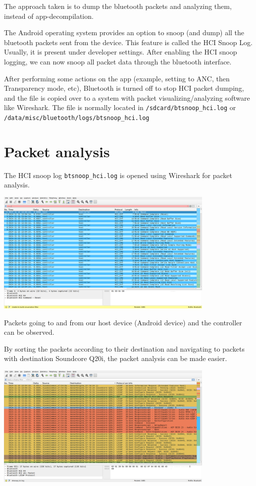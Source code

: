 \documentclass{article}
\theoremstyle{mytheoremstyle}
\theoremstyle{mytheoremstyle}
\theoremstyle{myproblemstyle}
\begin{document}
The approach taken is to dump the bluetooth packets and analyzing them, instead of app-decompilation.

The Android operating system provides an option to snoop (and dump) all the bluetooth packets sent from the device.
This feature is called the HCI Snoop Log. Usually, it is present under developer settings.
After enabling the HCI snoop logging, we can now snoop all packet data through the bluetooth interface.

After performing some actions on the app (example, setting to ANC, then Transparency mode, etc),
Bluetooth is turned off to stop HCI packet dumping,
and the file is copied over to a system with packet visualizing/analyzing software like Wireshark.
The file is normally located in \texttt{/sdcard/btsnoop\_hci.log} or \texttt{/data/misc/bluetooth/logs/btsnoop\_hci.log}


\section{Packet analysis}

The HCI snoop log \texttt{btsnoop\_hci.log} is opened using Wireshark for packet analysis.
\begin{center}
  \includegraphics[width=400px]{wireshark-launch}
\end{center}

Packets going to and from our host device (Android device) and the controller can be observed.

By sorting the packets according to their destination and navigating to packets with destination Soundcore Q20i,
the packet analysis can be made easier.
\begin{center}
  \includegraphics[width=400px]{wireshark-sorted}
\end{center}
\end{document}
